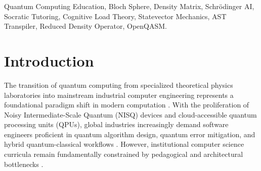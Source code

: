 \documentclass[conference]{IEEEtran}
\begin{document}
\begin{IEEEkeywords}
Quantum Computing Education, Bloch Sphere, Density Matrix, Schr{\"o}dinger AI, Socratic Tutoring, Cognitive Load Theory, Statevector Mechanics, AST Transpiler, Reduced Density Operator, OpenQASM.
\end{IEEEkeywords}

\section{Introduction}
\label{sec:intro}

The transition of quantum computing from specialized theoretical physics laboratories into mainstream industrial computer engineering represents a foundational paradigm shift in modern computation \cite{b1}. With the proliferation of Noisy Intermediate-Scale Quantum (NISQ) devices and cloud-accessible quantum processing units (QPUs), global industries increasingly demand software engineers proficient in quantum algorithm design, quantum error mitigation, and hybrid quantum-classical workflows \cite{b2}. However, institutional computer science curricula remain fundamentally constrained by pedagogical and architectural bottlenecks \cite{b3}.
\end{document}

